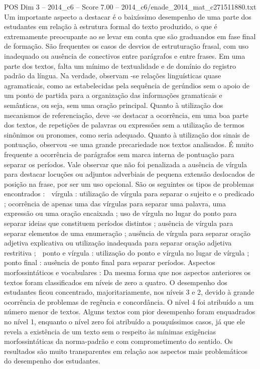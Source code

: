 \begin{textsample}{POS Dim 3 – 2014\_c6 – Score 7.00 – 2014\_c6/enade\_2014\_mat\_c271511880.txt}
Um importante aspecto a destacar é o baixíssimo desempenho de uma parte dos estudantes em relação à estrutura formal do texto produzido, o que é extremamente preocupante ao se levar em conta que são graduandos em fase final de formação.
São frequentes os casos de desvios de estruturação frasal, com uso inadequado ou ausência de conectivos entre parágrafos e entre frases.
Em uma parte dos textos, falta um mínimo de textualidade e de domínio do registro padrão da língua.
Na verdade, observam -se relações linguísticas quase agramaticais, como as estabelecidas pela sequência de gerúndios sem o apoio de um ponto de partida para a organização das informações gramaticais e semânticas, ou seja, sem uma oração principal.
Quanto à utilização dos mecanismos de referenciação, deve -se destacar a ocorrência, em uma boa parte dos textos, de repetições de palavras ou expressões sem a utilização de termos sinônimos ou pronomes, como seria adequado.
Quanto à utilização dos sinais de pontuação, observou -se uma grande precariedade nos textos analisados.
É muito frequente a ocorrência de parágrafos sem marca interna de pontuação para separar os períodos.
Vale observar que não foi penalizada a ausência de vírgula para destacar locuções ou adjuntos adverbiais de pequena extensão deslocados de posição na frase, por ser um uso opcional.
São os seguintes os tipos de problemas encontrados :  vírgula : utilização de vírgula para separar o sujeito e o predicado ; ocorrência de apenas uma das vírgulas para separar uma palavra, uma expressão ou uma oração encaixada ; uso de vírgula no lugar do ponto para separar ideias que constituem períodos distintos ; ausência de vírgula para separar elementos de uma enumeração ; ausência de vírgula para separar oração adjetiva explicativa ou utilização inadequada para separar oração adjetiva restritiva ;  ponto e vírgula : utilização do ponto e vírgula no lugar de vírgula ;  ponto final : ausência de ponto final para separar períodos.
Aspectos morfossintáticos e vocabulares : Da mesma forma que nos aspectos anteriores os textos foram classificados em níveis de zero a quatro.
O desempenho dos estudantes ficou concentrado, majoritariamente, nos níveis 3 e 2, devido à grande ocorrência de problemas de regência e concordância.
O nível 4 foi atribuído a um número menor de textos.
Alguns textos com pior desempenho foram enquadrados no nível 1, enquanto o nível zero foi atribuído a pouquíssimos casos, já que ele revela a existência de um texto sem o respeito às mínimas exigências morfossintáticas da norma-padrão e com comprometimento do sentido.
Os resultados são muito transparentes em relação aos aspectos mais problemáticos do desempenho dos estudantes.

\end{textsample}
